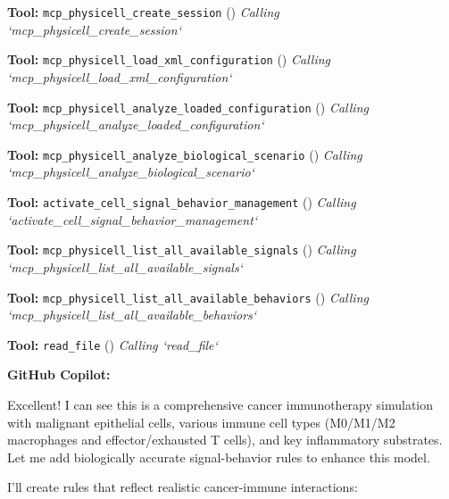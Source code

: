 \documentclass[11pt,a4paper]{article}
\begin{document}
\begin{toolokbox}
\textbf{Tool:} \texttt{mcp\_physicell\_create\_session} (\checkmark)
\textit{Calling `mcp\_physicell\_create\_session`}
\end{toolokbox}
\begin{toolokbox}
\textbf{Tool:} \texttt{mcp\_physicell\_load\_xml\_configuration} (\checkmark)
\textit{Calling `mcp\_physicell\_load\_xml\_configuration`}
\end{toolokbox}
\begin{toolokbox}
\textbf{Tool:} \texttt{mcp\_physicell\_analyze\_loaded\_configuration} (\checkmark)
\textit{Calling `mcp\_physicell\_analyze\_loaded\_configuration`}
\end{toolokbox}
\begin{toolokbox}
\textbf{Tool:} \texttt{mcp\_physicell\_analyze\_biological\_scenario} (\checkmark)
\textit{Calling `mcp\_physicell\_analyze\_biological\_scenario`}
\end{toolokbox}
\begin{toolokbox}
\textbf{Tool:} \texttt{activate\_cell\_signal\_behavior\_management} (\checkmark)
\textit{Calling `activate\_cell\_signal\_behavior\_management`}
\end{toolokbox}
\begin{toolokbox}
\textbf{Tool:} \texttt{mcp\_physicell\_list\_all\_available\_signals} (\checkmark)
\textit{Calling `mcp\_physicell\_list\_all\_available\_signals`}
\end{toolokbox}
\begin{toolokbox}
\textbf{Tool:} \texttt{mcp\_physicell\_list\_all\_available\_behaviors} (\checkmark)
\textit{Calling `mcp\_physicell\_list\_all\_available\_behaviors`}
\end{toolokbox}
\begin{toolokbox}
\textbf{Tool:} \texttt{read\_file} (\checkmark)
\textit{Calling `read\_file`}
\end{toolokbox}
\begin{copilotbox}
\textbf{GitHub Copilot:}

Excellent! I can see this is a comprehensive cancer immunotherapy simulation with malignant epithelial cells, various immune cell types (M0/M1/M2 macrophages and effector/exhausted T cells), and key inflammatory substrates. Let me add biologically accurate signal-behavior rules to enhance this model.

I'll create rules that reflect realistic cancer-immune interactions:

\end{copilotbox}
\end{document}
